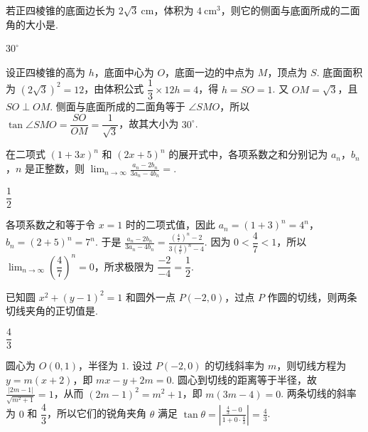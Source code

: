 \begin{problem}
若正四棱锥的底面边长为 \(2\sqrt{3}\mathrm{~cm}\)，体积为 \(4\mathrm{~cm}^{3}\)，则它的侧面与底面所成的二面角的大小是\fillinblank{}.
\end{problem}

\begin{answer}
\(30^{\circ}\)
\end{answer}

\begin{solution}
设正四棱锥的高为 \(h\)，底面中心为 \(O\)，底面一边的中点为 \(M\)，顶点为 \(S\). 底面面积为 \((2\sqrt{3})^2=12\)，由体积公式 \(\dfrac{1}{3}\times12h=4\)，得 \(h=SO=1\). 又 \(OM=\sqrt{3}\)，且 \(SO\perp OM\). 侧面与底面所成的二面角等于 \(\angle SMO\)，所以 \(\tan\angle SMO=\dfrac{SO}{OM}=\dfrac{1}{\sqrt{3}}\)，故其大小为 \(30^{\circ}\).
\end{solution}

\begin{problem}
在二项式 \((1 + 3x)^n\) 和 \((2x + 5)^n\) 的展开式中，各项系数之和分别记为 \(a_n\)，\(b_n\)，\(n\) 是正整数，则 \(\displaystyle\lim_{n \to \infty} \frac{a_n - 2b_n}{3a_n - 4b_n}=\)\fillinblank{}.
\end{problem}

\begin{answer}
\(\dfrac{1}{2}\)
\end{answer}

\begin{solution}
各项系数之和等于令 \(x=1\) 时的二项式值，因此 \(a_n=(1+3)^n=4^n\)，\(b_n=(2+5)^n=7^n\). 于是 \(\displaystyle\frac{a_n-2b_n}{3a_n-4b_n}=\frac{(\frac{4}{7})^n-2}{3(\frac{4}{7})^n-4}\). 因为 \(0<\dfrac{4}{7}<1\)，所以 \(\displaystyle\lim_{n\to\infty}\left(\dfrac{4}{7}\right)^n=0\)，所求极限为 \(\dfrac{-2}{-4}=\dfrac{1}{2}\).
\end{solution}

\begin{problem}
已知圆 \(x^{2} + (y - 1)^{2} = 1\) 和圆外一点 \(P(-2,0)\)，过点 \(P\) 作圆的切线，则两条切线夹角的正切值是\fillinblank{}.
\end{problem}

\begin{answer}
\(\dfrac{4}{3}\)
\end{answer}

\begin{solution}
圆心为 \(O(0,1)\)，半径为 \(1\). 设过 \(P(-2,0)\) 的切线斜率为 \(m\)，则切线方程为 \(y=m(x+2)\)，即 \(mx-y+2m=0\). 圆心到切线的距离等于半径，故 \(\displaystyle\frac{|2m-1|}{\sqrt{m^2+1}}=1\)，从而 \((2m-1)^2=m^2+1\)，即 \(m(3m-4)=0\). 两条切线的斜率为 \(0\) 和 \(\dfrac{4}{3}\)，所以它们的锐角夹角 \(\theta\) 满足 \(\displaystyle\tan\theta=\left|\frac{\frac{4}{3}-0}{1+0\cdot\frac{4}{3}}\right|=\frac{4}{3}\).
\end{solution}

